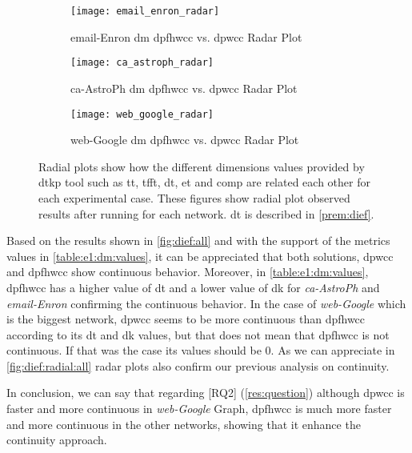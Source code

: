  \begin{figure}[!htp]
  \centering
  \begin{subfigure}[t]{0.3\textwidth}
   \texttt{[image: email\_enron\_radar]}
   \caption{email-Enron \acrlong{dm} \acrshort{dpfhwcc} vs. \acrshort{dpwcc} Radar Plot}
    \label{fig:dief:rad:new:1}
  \end{subfigure}\hfill
  \begin{subfigure}[t]{0.3\textwidth}
   \texttt{[image: ca\_astroph\_radar]}
   \caption{ca-AstroPh \acrlong{dm} \acrshort{dpfhwcc} vs. \acrshort{dpwcc} Radar Plot}
    \label{fig:dief:rad:new:2}
  \end{subfigure}\hfill
  \begin{subfigure}[t]{0.3\textwidth}
   \texttt{[image: web\_google\_radar]}
   \caption{web-Google \acrlong{dm} \acrshort{dpfhwcc} vs. \acrshort{dpwcc} Radar Plot}
    \label{fig:dief:rad:new:3}
  \end{subfigure}\hfill
   \caption{Radial plots show how the different dimensions values provided by \acrshort{dtkp} tool such as \acrshort{tt}, \acrshort{tfft}, \acrshort{dt}, \acrshort{et} and \acrshort{comp} are related each other for each experimental case. These figures show radial plot observed results after running for each network. \acrshort{dt} is described in \autoref{prem:dief}.}
   \label{fig:dief:radial:all}
 \end{figure}

Based on the results shown in \autoref{fig:dief:all} and with the support of the metrics values in \autoref{table:e1:dm:values}, it can be appreciated that both solutions, \acrshort{dpwcc} and \acrshort{dpfhwcc} show continuous behavior.
Moreover, in \autoref{table:e1:dm:values}, \acrshort{dpfhwcc} has a higher value of \acrshort{dt} and a lower value of \acrshort{dk} for \textit{ca-AstroPh} and \textit{email-Enron} confirming the continuous behavior. In the case of \textit{web-Google} which is the biggest network, \acrshort{dpwcc} seems to be more continuous than \acrshort{dpfhwcc} according to its \acrshort{dt} and \acrshort{dk} values, but that does not mean that \acrshort{dpfhwcc} is not continuous. If that was the case its values should be $0$.
As we can appreciate in \autoref{fig:dief:radial:all} radar plots also confirm our previous analysis on continuity.

In conclusion, we can say that regarding [RQ2] (\autoref{res:question}) although \acrshort{dpwcc} is faster and more continuous in \emph{web-Google} Graph, \acrshort{dpfhwcc} is much more faster and more continuous in the other networks, showing that it enhance the continuity approach.

